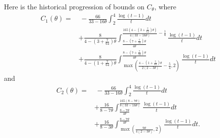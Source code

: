 Here is the historical progression of bounds on $C_\theta$, where
\begin{align}
\nonumber C_1(\theta) =&\ - \frac{66}{33 - 16 \theta} \int_{2}^{4} \frac{\log(t-1)}{t} d t \\
\nonumber & + \frac{8}{4 - \left(3 + \frac{7}{64} \right) \theta} \int_{\frac{8 - \left(7 + \frac{7}{32} \right) \theta }{4 \theta}}^{\frac{165\left(4-\left(3+\frac{7}{64} \right) \theta \right)}{4(33 - 16 \theta)} - \frac{1}{4}} \frac{\log(t-1)}{t} d t \\
\nonumber & + \frac{8}{4 - \left(1 + \frac{7}{64} \right) \theta} \int_{\max \left(\frac{4- \left(1+ \frac{7}{64} \right) \theta}{2 (2-3 \theta )} - \frac{5}{4}, 2 \right)}^{\frac{8 - \left(7 + \frac{7}{32} \right) \theta }{4 \theta}} \frac{\log(t-1)}{t} d t
\end{align}
and
\begin{align}
\nonumber C_2(\theta) =&\ - \frac{66}{33 - 16 \theta} \int_{2}^{4} \frac{\log(t-1)}{t} d t \\
\nonumber & + \frac{16}{8 - 7 \theta} \int_{\frac{8 - 7 \theta}{4 \theta}}^{\frac{165(8-7 \theta)}{8(33 - 16 \theta)} } \frac{\log(t-1)}{t} d t \\
\nonumber & + \frac{16}{8 - 3 \theta} \int_{\max \left(\frac{9 \theta}{4(2 - 3 \theta)}, 2 \right)}^{\frac{8 - 7 \theta}{4 \theta}} \frac{\log(t-1)}{t} d t.
\end{align}

